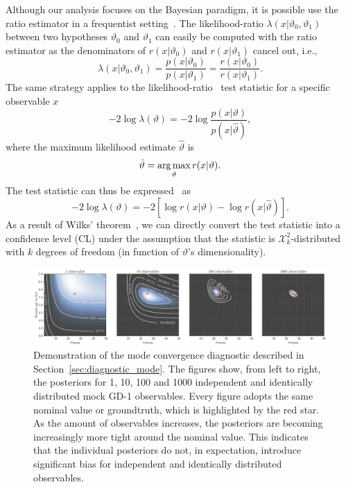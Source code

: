 \documentclass[fleqn,usenatbib]{mnras}
\begin{document}
Although our analysis
focuses on the Bayesian paradigm, it is possible use the ratio estimator in a frequentist setting~\citep{cranmer2015approximating,Brehmer:2019jyt}.
The likelihood-ratio $\lambda(x\vert\vartheta_0,\vartheta_1)$ between two hypotheses $\vartheta_0$ and $\vartheta_1$ can
easily be computed with the ratio estimator
as the denominators of $r(x\vert\vartheta_0)$ and $r(x\vert\vartheta_1)$ cancel out, i.e.,
\begin{equation}
  \label{eq:likelihood_ratio}
  \lambda(x\vert\vartheta_0,\vartheta_1) = \frac{p(x\vert\vartheta_0)}{p(x\vert\vartheta_1)} = \frac{r(x\vert\vartheta_0)}{r(x\vert\vartheta_1)}.
\end{equation}
The same
strategy applies to the likelihood-ratio~\citep{cowan2011asymptotic} test statistic for a specific observable $x$
\begin{equation}
  -2\log\lambda(\vartheta) = -2\log\frac{p(x\vert\vartheta)}{p(x\vert\hat{\vartheta})},
\end{equation}
where the maximum likelihood estimate $\hat{\vartheta}$ is
\begin{equation}
  \hat{\vartheta} = \operatorname*{arg\,max}_{\vartheta} r(x\vert\vartheta).
\end{equation}
The test statistic can thus be expressed~\citep{cranmer2015approximating} as
\begin{equation}
\label{eq:profile_likelihood}
  -2\log\lambda(\vartheta) = -2\left[\log r(x\vert\vartheta) - \log r(x\vert\hat{\vartheta})\right].
\end{equation}
As a result of Wilks' theorem~\citep{wilks1938large}, we can directly convert
the test statistic into a confidence level (CL)
under the assumption that the statistic is $\mathcal{X}_k^2$-distributed
with $k$ degrees of freedom (in function of $\vartheta$'s dimensionality).
\begin{figure}
    \centering
    \includegraphics[width=\linewidth]{figures/diagnostic_map_convergence.pdf}
    \caption{Demonstration of the mode convergence diagnostic described in Section~\ref{sec:diagnostic_mode}.
      The figures show, from left to right, the posteriors for 1, 10, 100 and 1000 independent and identically
      distributed mock GD-1 observables.
      Every figure adopts the same nominal value or groundtruth, which is highlighted by the red star. As the amount of observables increases,
      the posteriors are becoming increasingly more tight around the nominal value.
      This indicates that the individual posteriors do not, in expectation, introduce significant bias for independent and
      identically distributed observables.
      ~~\protect{}}
    \label{fig:diagnostic_map_convergence}
\end{figure}
\end{document}
